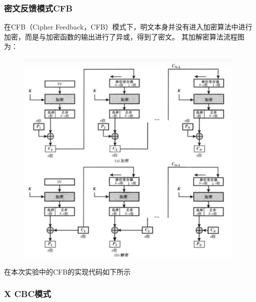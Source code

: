 \documentclass[a4paper,11pt,UTF8]{ctexart}
\newcommand{\bottomcaption}{%
\setlength{\abovecaptionskip}{6pt}%
\setlength{\belowcaptionskip}{6pt}%
\caption}
\newcommand{\xiaowuhao}{\fontsize{9pt}{\baselineskip}\selectfont}   %
\begin{document}
        \subsubsection{密文反馈模式CFB}
            在CFB（Cipher Feedback，CFB）模式下，明文本身并没有进入加密算法中进行加密，而是与加密函数的输出进行了异或，得到了密文。
            其加解密算法流程图为：
            \begin{figure}[H]
                \centering
                \includegraphics[width=11cm]{CFB.png}
                \bottomcaption{\xiaowuhao{CFB加解密流程}}
            \end{figure}
\newpage
            在本次实验中的CFB的实现代码如下所示
            

        \subsubsection{X CBC模式}
\end{document}
